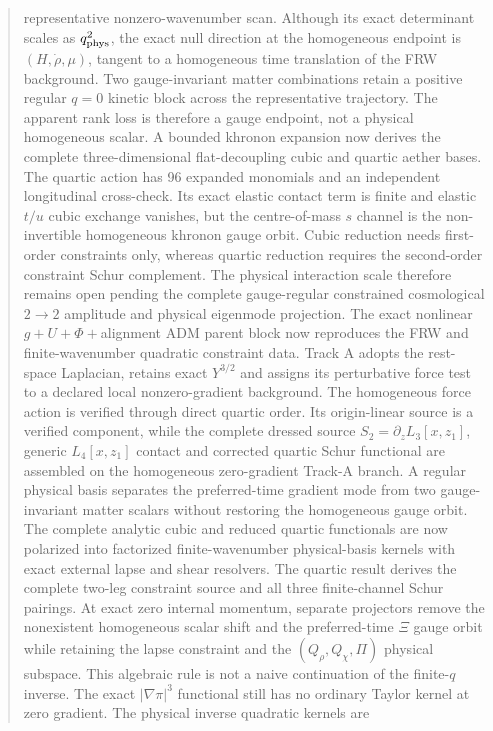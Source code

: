 \documentclass[11pt]{article}
\begin{document}
\begin{abstract}
representative nonzero-wavenumber scan.  Although its exact determinant scales
as $q_{\rm phys}^2$, the exact null direction at the homogeneous endpoint is
$(H,\dot\rho,\mu)$, tangent to a homogeneous time translation of the FRW
background.  Two gauge-invariant matter combinations retain a positive regular
$q=0$ kinetic block across the representative trajectory.  The apparent rank
loss is therefore a gauge endpoint, not a physical homogeneous scalar.  A
bounded khronon expansion now derives the complete three-dimensional
flat-decoupling cubic and quartic aether bases.  The quartic action has 96
expanded monomials and an independent longitudinal cross-check.  Its exact
elastic contact term is finite and elastic $t/u$ cubic exchange vanishes, but
the centre-of-mass $s$ channel is the non-invertible homogeneous khronon gauge
orbit.  Cubic reduction needs first-order constraints only, whereas quartic
reduction requires the second-order constraint Schur complement.  The physical
interaction scale therefore remains open pending the complete gauge-regular
constrained cosmological $2\to2$ amplitude and physical eigenmode projection.
The exact nonlinear $g+U+\Phi+$alignment ADM parent block now reproduces the
FRW and finite-wavenumber quadratic constraint data.  Track A adopts the
rest-space Laplacian, retains exact $Y^{3/2}$ and assigns its perturbative
force test to a declared local nonzero-gradient background.  The homogeneous
force action is verified through direct quartic order.  Its origin-linear
source is a verified component, while the complete dressed source
$S_2=\partial_zL_3[x,z_1]$, generic $L_4[x,z_1]$ contact and corrected
quartic Schur functional are assembled on the homogeneous zero-gradient
Track-A branch.  A regular physical basis separates the preferred-time
gradient mode from two gauge-invariant matter scalars without restoring the
homogeneous gauge orbit.  The complete analytic cubic and reduced quartic
functionals are now polarized into factorized finite-wavenumber
physical-basis kernels with exact
external lapse and shear resolvers.  The quartic result derives the complete
two-leg constraint source and all three finite-channel Schur pairings.  At
exact zero internal momentum, separate projectors remove the nonexistent
homogeneous scalar shift and the preferred-time $\Xi$ gauge orbit while
retaining the lapse constraint and the $(Q_\rho,Q_\chi,\Pi)$ physical
subspace.  This algebraic rule is not a naive continuation of the finite-$q$
inverse.  The exact $|\nabla\pi|^3$ functional still has no ordinary Taylor
kernel at zero gradient.  The physical inverse quadratic kernels are

\end{abstract}
\end{document}
